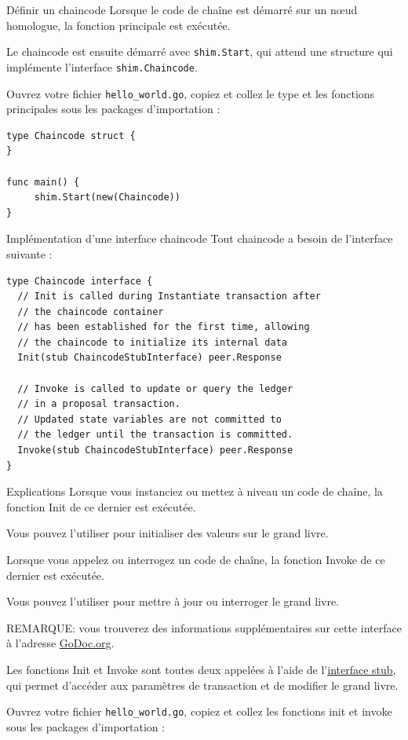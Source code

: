 \documentclass[presentation]{beamer}
\begin{document}
\begin{frame}[fragile,label={sec:org59c5657}]{Définir un chaincode}
 Lorsque le code de chaîne est démarré sur un nœud homologue, la fonction principale est exécutée. 

Le chaincode est ensuite démarré avec \texttt{shim.Start}, qui attend une structure qui implémente l'interface \texttt{shim.Chaincode}.

Ouvrez votre fichier \texttt{hello\_world.go}, copiez et collez le type et les fonctions principales sous les packages d'importation :

\begin{verbatim}
type Chaincode struct {
}

func main() {
     shim.Start(new(Chaincode))
}
\end{verbatim}
\end{frame}
\begin{frame}[fragile,label={sec:org9de767d}]{Implémentation d'une interface chaincode}
 Tout chaincode a besoin de l'interface suivante : 

\begin{verbatim}
type Chaincode interface {
  // Init is called during Instantiate transaction after 
  // the chaincode container
  // has been established for the first time, allowing 
  // the chaincode to initialize its internal data
  Init(stub ChaincodeStubInterface) peer.Response

  // Invoke is called to update or query the ledger 
  // in a proposal transaction.
  // Updated state variables are not committed to 
  // the ledger until the transaction is committed.
  Invoke(stub ChaincodeStubInterface) peer.Response
}
\end{verbatim}
\end{frame}
\begin{frame}[fragile,label={sec:org6e36154}]{Explications}
 Lorsque vous instanciez ou mettez à niveau un code de chaîne, la fonction Init de ce dernier est exécutée. 

Vous pouvez l'utiliser pour initialiser des valeurs sur le grand livre.

Lorsque vous appelez ou interrogez un code de chaîne, la fonction Invoke de ce dernier est exécutée. 

Vous pouvez l'utiliser pour mettre à jour ou interroger le grand livre.

REMARQUE: vous trouverez des informations supplémentaires sur cette interface à l'adresse \href{https://godoc.org/github.com/hyperledger/fabric/core/chaincode/shim\#Chaincode}{GoDoc.org}.

Les fonctions Init et Invoke sont toutes deux appelées à l’aide de l’\href{https://godoc.org/github.com/hyperledger/fabric/core/chaincode/shim\#ChaincodeStubInterface}{interface stub}, qui permet 
d’accéder aux paramètres de transaction et de modifier le grand livre.

Ouvrez votre fichier \texttt{hello\_world.go}, copiez et collez les fonctions init et invoke sous les packages d'importation :
\end{frame}
\end{document}
